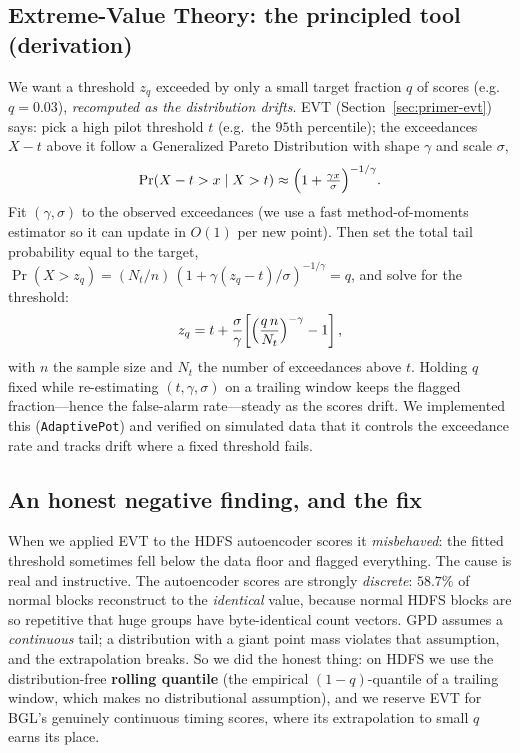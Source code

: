 \documentclass[11pt,a4paper]{article}
\newcommand{\keyword}[1]{\textbf{\color{accent}#1}}
\newcommand{\code}[1]{\texttt{\small #1}}
\begin{document}
\subsection{Extreme-Value Theory: the principled tool (derivation)}
We want a threshold $z_q$ exceeded by only a small target fraction $q$ of scores
(e.g.\ $q=0.03$), \emph{recomputed as the distribution drifts}. EVT
(Section~\ref{sec:primer-evt}) says: pick a high pilot threshold $t$ (e.g.\ the
$95$th percentile); the exceedances $X-t$ above it follow a Generalized Pareto
Distribution with shape $\gamma$ and scale $\sigma$,
\begin{equation}
\Pr(X-t>x\mid X>t)\approx\Bigl(1+\tfrac{\gamma x}{\sigma}\Bigr)^{-1/\gamma}.
\end{equation}
Fit $(\gamma,\sigma)$ to the observed exceedances (we use a fast method-of-moments
estimator so it can update in $O(1)$ per new point). Then set the total tail
probability equal to the target, $\Pr(X>z_q)=(N_t/n)\,(1+\gamma(z_q-t)/\sigma)^{-1/\gamma}=q$,
and solve for the threshold:
\begin{equation}
z_q=t+\frac{\sigma}{\gamma}\!\left[\Bigl(\frac{q\,n}{N_t}\Bigr)^{-\gamma}-1\right],
\end{equation}
with $n$ the sample size and $N_t$ the number of exceedances above $t$. Holding
$q$ fixed while re-estimating $(t,\gamma,\sigma)$ on a trailing window keeps the
flagged fraction---hence the false-alarm rate---steady as the scores drift. We
implemented this (\code{AdaptivePot}) and verified on simulated data that it
controls the exceedance rate and tracks drift where a fixed threshold fails.

\subsection{An honest negative finding, and the fix}
When we applied EVT to the HDFS autoencoder scores it \emph{misbehaved}: the fitted
threshold sometimes fell below the data floor and flagged everything. The cause is
real and instructive. The autoencoder scores are strongly \emph{discrete}:
$58.7\%$ of normal blocks reconstruct to the \emph{identical} value, because normal
HDFS blocks are so repetitive that huge groups have byte-identical count vectors.
GPD assumes a \emph{continuous} tail; a distribution with a giant point mass
violates that assumption, and the extrapolation breaks. So we did the honest
thing: on HDFS we use the distribution-free \keyword{rolling quantile} (the
empirical $(1-q)$-quantile of a trailing window, which makes no distributional
assumption), and we reserve EVT for BGL's genuinely continuous timing scores,
where its extrapolation to small $q$ earns its place.
\end{document}
